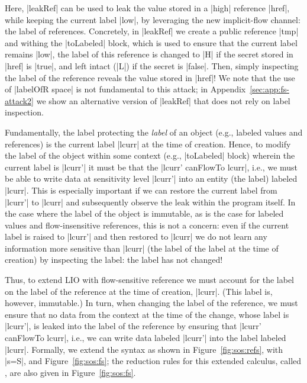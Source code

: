 \noindent
%
Here, |leakRef| can be used to leak the value stored in a |high| reference
|href|, while keeping the current label |low|, by leveraging the new
implicit-flow channel: the label of references.
%
Concretely, in |leakRef| we create a public reference |tmp| and withing the
|toLabeled| block, which is used to ensure that the current label remains
|low|, the label of this reference is changed to |H| if the secret stored in
|href| is |true|, and left intact (|L|) if the secret is |false|.
%
Then, simply inspecting the label of the reference reveals the value stored in
|href|!
%
We note that the use of |labelOfR space| is not fundamental to this attack; in
Appendix~\ref{sec:app:fs-attack2} we show an alternative version of |leakRef|
that does not rely on label inspection.

Fundamentally, the label protecting the \emph{label} of an object (e.g.,
labeled values and references) is the current label |lcurr| at the time of
creation.
%
Hence, to modify the label of the object within some context (e.g., |toLabeled|
block) wherein the current label is |lcurr'| it must be that the |lcurr'
canFlowTo lcurr|, i.e., we must be able to write data at sensitivity level
|lcurr'| into an entity (the label) labeled |lcurr|.
%
This is especially important if we can restore the current label from |lcurr'|
to |lcurr| and subsequently observe the leak within the program itself.
%
In the case where the label of the object is immutable, as is the case for
labeled values and flow-insensitive references, this is not a concern: even if
the current label is raised to |lcurr'| and then restored to |lcurr| we do not
learn any information more sensitive than |lcurr| (the label of the label at
the time of creation) by inspecting the label: the label has not changed!
%

\concept{\liofs{}}
Thus, to extend LIO with flow-sensitive reference we must account for the label
on the label of the reference at the time of creation, |lcurr|.
%
(This label is, however, immutable.)
%
In turn, when changing the label of the reference, we must ensure that no data
from the context at the time of the change, whose label is |lcurr'|, is leaked
into the label of the reference by ensuring that |lcurr' canFlowTo lcurr|,
i.e., we can write data labeled |lcurr'| into the label labeled |lcurr|.
%
Formally, we extend the \lio{} syntax as shown in Figure~\ref{fig:sos:refs},
with |s=S|, and Figure~\ref{fig:sos:fs};
%
the reduction rules for this extended calculus, called \liofs{}, are also
given in Figure~\ref{fig:sos:fs}.

